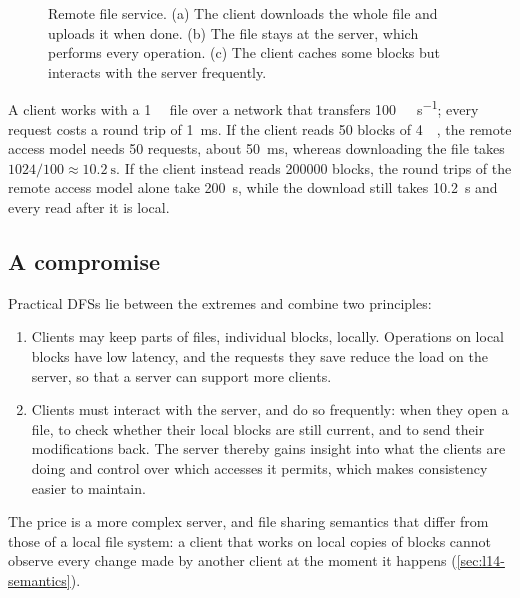 \documentclass[../main.tex]{subfiles}
\begin{document}
\begin{figure}[htbp]
  \centering
  
  \caption{Remote file service.  (a) The client downloads the whole file
    and uploads it when done.  (b) The file stays at the server, which
    performs every operation.  (c) The client caches some blocks but
    interacts with the server frequently.}
  \label{fig:l14-remote}
\end{figure}

\begin{example}
  \label{ex:l14-download}
  A client works with a \SI{1}{\gibi\byte} file over a network that
  transfers \SI[per-mode=symbol]{100}{\mebi\byte\per\second}; every request
  costs a round trip of \SI{1}{\milli\second}.  If the client reads 50
  blocks of \SI{4}{\kibi\byte}, the remote access model needs 50 requests,
  about \SI{50}{\milli\second}, whereas downloading the file takes
  $1024/100 \approx \SI{10.2}{\second}$.  If the client instead reads
  \num{200000} blocks, the round trips of the remote access model alone
  take \SI{200}{\second}, while the download still takes
  \SI{10.2}{\second} and every read after it is local.
\end{example}

\subsection{A compromise}

Practical DFSs lie between the extremes and combine two principles:
\begin{enumerate}
  \item Clients may keep parts of files, individual blocks,
    locally.
    Operations on local blocks have low latency, and the requests they
    save reduce the load on the server, so that a server can support more
    clients.
  \item Clients must interact with the server, and do so frequently: when
    they open a file, to check whether their local blocks are still
    current, and to send their modifications back.  The server thereby
    gains insight into what the clients are doing and control over which
    accesses it permits, which makes consistency easier to maintain.
\end{enumerate}
The price is a more complex server, and file sharing semantics that differ
from those of a local file system: a client that works on local copies of
blocks cannot observe every change made by another client at the moment
it happens (\cref{sec:l14-semantics}).
\end{document}
